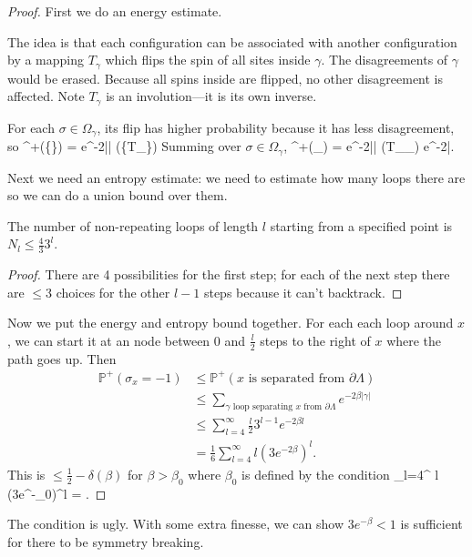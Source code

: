 \documentclass[12pt]{book}
\theoremstyle{norm}
\begin{document}
\begin{proof}
First we do an energy estimate.

The idea is that each configuration can be associated with another configuration by a mapping $T_\gamma$ which flips the spin of all sites inside $\gamma$. The disagreements of $\gamma$ would be erased. Because all spins inside are flipped, no other disagreement is affected. Note $T_\gamma$ is an involution---it is its own inverse.

For each $\sigma\in \Omega_{\gamma}$, its flip has higher probability because it has less disagreement, so
\be
{}^+(\{\sigma\}) = e^{-2\beta |\gamma|} (\{T_\gamma\sigma\})%
\ee
Summing over $\sigma\in \Omega_{\gamma}$,
\be
{}^+(\Omega_{\gamma}) = e^{-2\beta |\gamma|} (T_\gamma\Omega_{\gamma}) \le e^{-2\beta |\gamma}.
\ee

Next we need an entropy estimate: we need to estimate how many loops there are so we can do a union bound over them.
\begin{lemma}
The number of non-repeating loops of length $l$ starting from a specified point is $N_l\le \frac{4}{3}3^l$.
\end{lemma}
\begin{proof}
There are 4 possibilities for the first step; for each of the next step there are $\le3$ choices for the other $l-1$ steps because it can't backtrack.
\end{proof}

Now we put the energy and entropy bound together.
For each each loop around $x$, we can start it at an node between 0 and $\frac{l}{2}$ steps to the right of $x$ where the path goes up. Then %
\begin{align*}
\mathbb{P}^+(\sigma_x=-1) &\le \mathbb{P}^+\left( \text{$x$ is separated from $\partial \Lambda$} \right)\\ 
&\le \sum_{\gamma\text{ loop separating $x$ from $\partial \Lambda$}} e^{-2\beta |\gamma|}\\
&\le \sum_{l=4}^{\infty} \frac{l}{2} 3^{l-1} e^{-2\beta l}\\
&=\frac{1}{6} \sum_{l=4}^{\infty} l(3e^{-2\beta})^l.
\end{align*}
This is $\le \frac{1}{2} - \delta(\beta)$ for $\beta>\beta_0$ where  $\beta_0$ is defined by the condition
\be
{} \sum_{l=4}^{\infty} l (3e^{-\beta_0})^l = .
\ee
\end{proof}
The condition is ugly. With some extra finesse, we can show $3e^{-\beta}<1$ is sufficient for there to be symmetry breaking.
\end{document}
